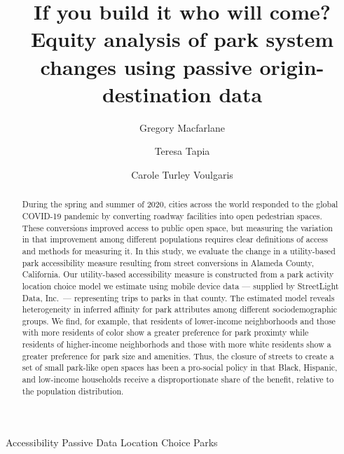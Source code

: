 \documentclass[3p, authoryear, review]{elsarticle} %
\begin{document}
\begin{frontmatter}

  \title{If you build it who will come? Equity analysis of park system changes using passive origin-destination data}
    \author[BYU]{Gregory Macfarlane}
    \author[StreetLight]{Teresa Tapia}
    \author[Harvard]{Carole Turley Voulgaris}
      \address[BYU]{Brigham Young University, Civil and Environmental Engineering Department, 430 Engineering Building, Provo, Utah 84602}
    \address[Harvard]{Harvard Graduate School of Design, 48 Quincy St, Cambridge, Massachussetts 02138}
    \address[StreetLight]{StreetLight Data, Inc., San Francisco, California}
  
  \begin{abstract}
  During the spring and summer of 2020, cities across the world responded to the global COVID-19 pandemic by converting roadway facilities into open pedestrian spaces. These conversions improved access to public open space, but measuring the variation in that improvement among different populations requires clear definitions of access and methods for measuring it. In this study, we evaluate the change in a utility-based park accessibility measure resulting from street conversions in Alameda County, California. Our utility-based accessibility measure is constructed from a park activity location choice model we estimate using mobile device data --- supplied by StreetLight Data, Inc.~--- representing trips to parks in that county. The estimated model reveals heterogeneity in inferred affinity for park attributes among different sociodemographic groups. We find, for example, that residents of lower-income neighborhoods and those with more residents of color show a greater preference for park proximty while residents of higher-income neighborhods and those with more white residents show a greater preference for park size and amenities. Thus, the closure of streets to create a set of small park-like open spaces has been a pro-social policy in that Black, Hispanic, and low-income households receive a disproportionate share of the benefit, relative to the population distribution.
  \end{abstract}
   \begin{keyword} Accessibility Passive Data Location Choice Parks\end{keyword}
 \end{frontmatter}
\end{document}

